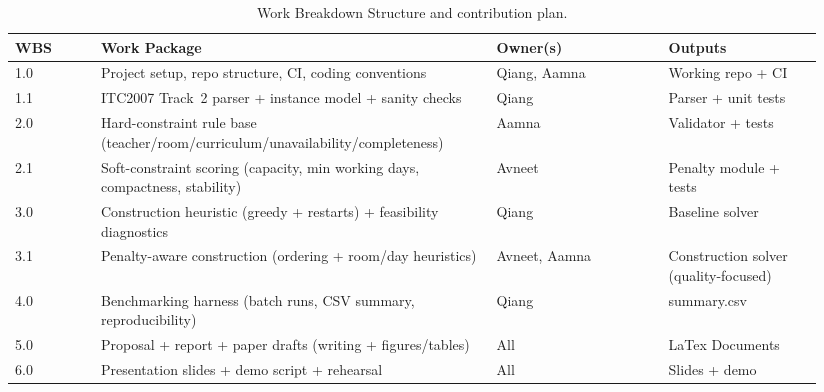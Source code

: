 \documentclass[11pt,letterpaper]{article}
\begin{document}
\begin{table}[h]
\centering
\small
\begin{tabular}{@{}p{0.10\linewidth}p{0.46\linewidth}p{0.20\linewidth}p{0.18\linewidth}@{}}
\toprule
\textbf{WBS} & \textbf{Work Package} & \textbf{Owner(s)} & \textbf{Outputs} \\
\midrule
1.0 & Project setup, repo structure, CI, coding conventions & Qiang, Aamna & Working repo + CI \\
1.1 & ITC2007 Track~2 parser + instance model + sanity checks & Qiang & Parser + unit tests \\
2.0 & Hard-constraint rule base (teacher/room/curriculum/unavailability/completeness) & Aamna & Validator + tests \\
2.1 & Soft-constraint scoring (capacity, min working days, compactness, stability) & Avneet & Penalty module + tests \\
3.0 & Construction heuristic (greedy + restarts) + feasibility diagnostics & Qiang & Baseline solver \\
3.1 & Penalty-aware construction (ordering + room/day heuristics) & Avneet, Aamna & Construction solver (quality-focused) \\
4.0 & Benchmarking harness (batch runs, CSV summary, reproducibility) & Qiang & summary.csv \\
5.0 & Proposal + report + paper drafts (writing + figures/tables) & All & LaTex Documents  \\
6.0 & Presentation slides + demo script + rehearsal & All & Slides + demo \\
\bottomrule
\end{tabular}
\caption{Work Breakdown Structure and contribution plan.}
\label{tab:wbs}
\end{table}
\end{document}

